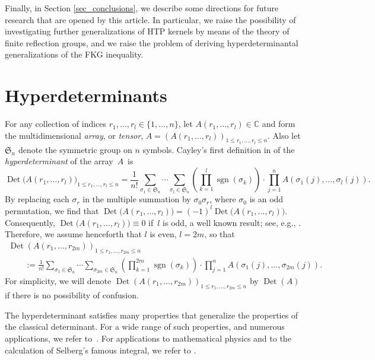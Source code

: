\documentclass[10pt,a4paper]{amsart}
\numberwithin{equation}{section}
\def\C{{\mathbb C}}
\def\sgn{\operatorname{sgn}}
\def\Det{\operatorname{Det}}
\def\frS{\mathfrak{S}}
\begin{document}
Finally, in Section \ref{sec_conclusions}, we describe some directions for future research that are opened by this article. In particular, we raise the possibility of investigating further generalizations of HTP kernels by means of the theory of finite reflection groups, and we raise the problem of deriving hyperdeterminantal generalizations of the FKG inequality.



\section{Hyperdeterminants}
\label{sec_hyperdeterminants}

For any collection of indices $r_1,\dots,r_l \in \{1,\dots,n\}$, let $A(r_1,\dots,r_l) \in \C$ and form the multidimensional \textit{array}, or \textit{tensor},
$A = (A(r_1,\dots,r_l))_{1 \le r_1,\dots,r_l \le n}$. Also let $\frS_n$ denote the symmetric group on $n$ symbols. Cayley's first definition in \cite{cayley46,cayley89, cayley45} of the {\it hyperdeterminant} of the array~$A$~is
\[
\Det\bigl(A(r_1,\dots,r_l)\bigr)_{1 \le r_1,\dots,r_l \le n}
= \frac{1}{n!} \sum_{\sigma_1 \in \frS_n} \cdots \sum_{\sigma_l \in \frS_n} \left(\prod_{k=1}^l \sgn(\sigma_k)\right) \cdot \prod_{j=1}^n A(\sigma_1(j),\dots,\sigma_l(j)).
\]
By replacing each $\sigma_r$ in the multiple summation by $\sigma_0 \sigma_r$, where $\sigma_0$ is an odd permutation, we find that $\Det\bigl(A(r_1,\dots,r_l)\bigr) = (-1)^l \Det\bigl(A(r_1,\dots,r_l)\bigr)$. Consequently, $\Det\bigl(A(r_1,\dots,r_l)\bigr) \equiv 0$ if~$l$ is odd, a well known result; see, e.g., \cite[Section 2]{luquethibon}. Therefore, we assume henceforth that $l$ is even, $l = 2m$, so that
\begin{gather}
\Det(A(r_1,\dots,r_{2m}))_{1 \le r_1,\dots,r_{2m} \le n} \nonumber\\
\qquad:= \frac{1}{n!} \sum_{\sigma_1 \in \frS_n} \cdots \sum_{\sigma_{2m} \in \frS_n} \left(\prod_{k=1}^{2m} \sgn(\sigma_k)\right) \cdot \prod_{j=1}^n A(\sigma_1(j),\dots,\sigma_{2m}(j)).\label{hyperdet}
\end{gather}
For simplicity, we will denote $\Det(A(r_1,\dots,r_{2m}))_{1 \le r_1,\dots,r_{2m} \le n}$ by $\Det(A)$ if there is no possibility of confusion.

The hyperdeterminant satisfies many properties that generalize the properties of the classical determinant. For a wide range of such properties, and numerous applications, we refer to~\cite{cayley46,cayley89,cayley45,evans,GKZ1,GKZ,hval,lecat19,oldenburger,rice,sokolov60, sokolov72}. For applications to mathematical physics and to the calculation of Selberg's famous integral, we refer to \cite{boussicault,luquethibon03,luquethibon}.
\end{document}

